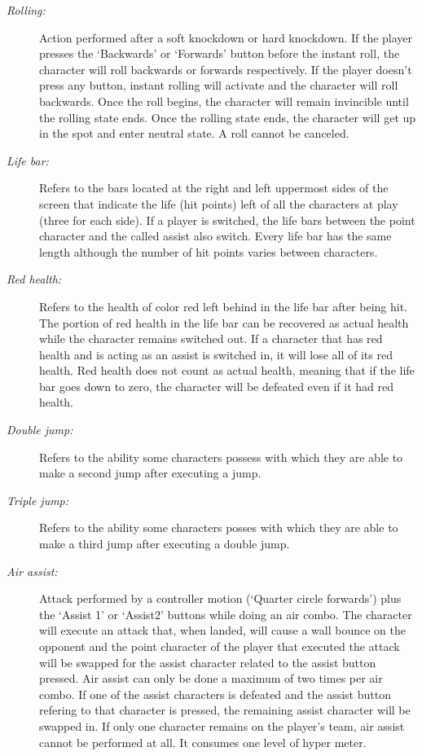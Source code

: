 \documentclass{article}
\begin{document}
\begin{flushleft}
\begin{description}
\item[\textit{Rolling:}] Action performed after a soft knockdown or hard knockdown. If the player presses the `Backwards' or `Forwards' button before the instant roll, the character will roll backwards or forwards respectively. If the player doesn't press any button, instant rolling will activate and the character will roll backwards. Once the roll begins, the character will remain invincible until the rolling state ends.  Once the rolling state ends, the character will get up in the spot and enter neutral state. A roll cannot be canceled.
\item[\textit{Life bar:}] Refers to the bars located at the right and left uppermost sides of the screen that indicate the life (hit points) left of all the characters at play (three for each side). If a player is switched, the life bars between the point character and the called assist also switch. Every life bar has the same length although the number of hit points varies between characters.
\item[\textit{Red health:}] Refers to the health of color red left behind in the life bar after being hit. The portion of red health in the life bar can be recovered as actual health while the character remains switched out. If a character that has red health and is acting as an assist is switched in, it will lose all of its red health. Red health does not count as actual health, meaning that if the life bar goes down to zero, the character will be defeated even if it had red health.
\item[\textit{Double jump:}] Refers to the ability some characters possess with which they are able to make a second jump after executing a jump.
\item[\textit{Triple jump:}] Refers to the ability some characters posses with which they are able to make a third jump after executing a double jump.
\item[\textit{Air assist:}] Attack performed by a controller motion (`Quarter circle forwards') plus the `Assist 1' or `Assist2' buttons while doing an air combo. The character will execute an attack that, when landed, will cause a wall bounce on the opponent and the point character of the player that executed the attack will be swapped for the assist character related to the assist button pressed. Air assist can only be done a maximum of two times per air combo. If one of the assist characters is defeated and the assist button refering to that character is pressed, the remaining assist character will be swapped in. If only one character remains on the player's team, air assist cannot be performed at all. It consumes one level of hyper meter.

\end{description}
\end{flushleft}
\end{document}
